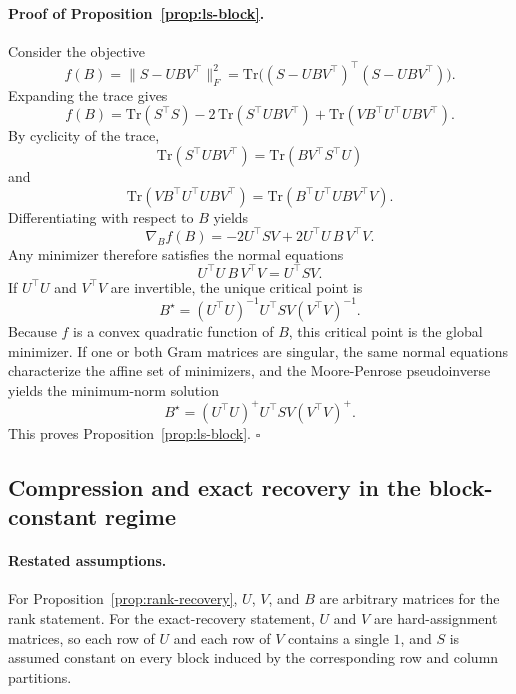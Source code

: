 \documentclass[11pt,a4paper]{article}
\begin{document}
\paragraph{Proof of Proposition~\ref{prop:ls-block}.}
Consider the objective
\[
f(B) = \|S-UBV^\top\|_F^2 = \mathrm{Tr}\big((S-UBV^\top)^\top(S-UBV^\top)\big).
\]
Expanding the trace gives
\[
f(B)=\mathrm{Tr}(S^\top S) - 2\,\mathrm{Tr}(S^\top U B V^\top) + \mathrm{Tr}(V B^\top U^\top U B V^\top).
\]
By cyclicity of the trace,
\[
\mathrm{Tr}(S^\top U B V^\top)=\mathrm{Tr}(B V^\top S^\top U)
\]
and
\[
\mathrm{Tr}(V B^\top U^\top U B V^\top)=\mathrm{Tr}(B^\top U^\top U B V^\top V).
\]
Differentiating with respect to $B$ yields
\[
\nabla_B f(B) = -2U^\top S V + 2U^\top U\,B\,V^\top V.
\]
Any minimizer therefore satisfies the normal equations
\[
U^\top U\,B\,V^\top V = U^\top S V.
\]
If $U^\top U$ and $V^\top V$ are invertible, the unique critical point is
\[
B^\star = (U^\top U)^{-1}U^\top S V (V^\top V)^{-1}.
\]
Because $f$ is a convex quadratic function of $B$, this critical point is the global minimizer. If one or both Gram matrices are singular, the same normal equations characterize the affine set of minimizers, and the Moore-Penrose pseudoinverse yields the minimum-norm solution
\[
B^\star = (U^\top U)^+ U^\top S V (V^\top V)^+.
\]
This proves Proposition~\ref{prop:ls-block}. \hfill $\square$

\subsection{Compression and exact recovery in the block-constant regime}

\paragraph{Restated assumptions.}
For Proposition~\ref{prop:rank-recovery}, $U$, $V$, and $B$ are arbitrary matrices for the rank statement. For the exact-recovery statement, $U$ and $V$ are hard-assignment matrices, so each row of $U$ and each row of $V$ contains a single $1$, and $S$ is assumed constant on every block induced by the corresponding row and column partitions.
\end{document}
